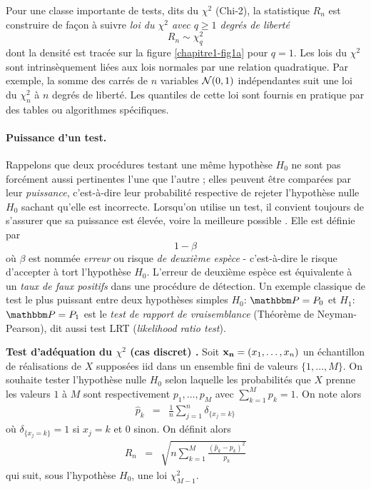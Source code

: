 Pour une classe importante de tests, dits du $\chi^2$ (Chi-2), la statistique $R_n$  est construire de fa\c con \`a suivre {\it loi du $\chi^2$ avec $q\geq 1 $ degr\'es de libert\'e} 
$$
R_n \sim \chi^2_q
$$
dont la densit\'e est trac\'ee sur la figure \ref{chapitre1-fig1a} pour $q=1$. Les lois du $\chi^2$ sont intrins\`equement li\'ees aux lois normales par une relation quadratique. Par exemple, la somme des carr\'es de $n$ variables ${\cal{N}}(0,1)$ ind\'ependantes suit une loi du  $\chi^2_n$ \`a $n$ degr\'es de libert\'e.  Les quantiles de cette loi sont fournis en pratique par des tables ou algorithmes sp\'ecifiques. \\

\paragraph*{\bf Puissance d'un test.} Rappelons que deux proc\'edures testant une m\^eme hypoth\`ese $H_0$ ne sont pas forc\'ement aussi pertinentes l'une que l'autre ; elles peuvent \^etre compar\'ees par leur {\it puissance}, c'est-\`a-dire leur probabilit\'e respective de rejeter l'hypoth\`ese nulle $H_0$ sachant qu'elle est incorrecte. Lorsqu'on utilise un test, il convient toujours de s'assurer que sa puissance est \'elev\'ee, voire la meilleure possible \cite{Sprenger2017}. Elle est d\'efinie par
$$
1-\beta
$$
o\`u $\beta$ est nomm\'ee {\it erreur} ou risque {\it de deuxi\`eme esp\`ece} - c'est-\`a-dire le risque d'accepter \`a tort l'hypoth\`ese $H_0$. L'erreur de deuxi\`eme esp\`ece est \'equivalente \`a un {\it taux de faux positifs} dans une proc\'edure de d\'etection. Un exemple classique de test le plus puissant entre deux hypoth\`eses simples $H_0$: $\Pm=P_0$ et $H_1$: $\Pm=P_1$ est le {\it test de rapport de vraisemblance} (Th\'eor\`eme de Neyman-Pearson), dit aussi test LRT ({\it likelihood ratio  test}). \\

\begin{exo}\label{chi2test.uni} {\bf Test d'ad\'equation du $\chi^2$ (cas discret) \cite{Cochran1952}.} 
Soit ${\bf x_n}=(x_1,\ldots,x_n)$ un \'echantillon de r\'ealisations de $X$ suppos\'ees iid dans un ensemble fini de valeurs $\{1,\ldots,M\}$. On souhaite tester l'hypoth\`ese nulle $H_0$ selon laquelle les probabilit\'es que $X$ prenne les valeurs $1$ \`a $M$ sont respectivement $p_1,\ldots,p_M$ avec $\sum_{k=1}^M p_k=1$. On note alors
\begin{eqnarray*}
\hat{p}_k & = & \frac{1}{n}\sum\limits_{j=1}^n \delta_{\{x_j=k\}}  
\end{eqnarray*}
o\`u $\delta_{\{x_j=k\}}=1$ si $x_j=k$ et 0 sinon. 
On d\'efinit alors
\begin{eqnarray}
R_n & = & \sqrt{n\sum\limits_{k=1}^M \frac{\left( \hat{p}_k - p_k\right)^2}{p_k}} \label{criter.chi2}
\end{eqnarray}
qui suit, sous l'hypoth\`ese $H_0$, une loi $\chi^2_{M-1}$. \\ 
\end{exo}

